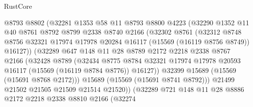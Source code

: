 \begin{lexlean}{RustCore}
\begin{coremodule}
                      @8793
                      @8802
                      (@32281
                        @1353
                        @58
                        @11
                        @8793
                        @8800
                        @4223
                        (@32290
                          @1352
                          @11
                          @40
                          @8761
                          @8792
                          @8799
                          @2338
                          @8740
                          @2166
                          (@32302
                            @8761
                            (@32312
                              @8748
                              @8756
                              @32321
                              @17974
                              @17978
                              @20284
                              @16117
                              (@15569 (@16119 @8756 @8749))
                              @16127))
                          (@32289
                            @647
                            @148
                            @11
                            @28
                            @8789
                            @2172
                            @2218
                            @2338
                            @8767
                            @2166
                            (@32428
                              @8789
                              (@32434
                                @8775
                                @8784
                                @32321
                                @17974
                                @17978
                                @20593
                                @16117
                                (@15569 (@16119 @8784 @8776))
                                @16127))
                            @32399
                            @15689
                            (@15569 (@15691 @8768 @2172)))
                          @15689
                          (@15569 (@15691 @8741 @8792)))
                        @21499
                        @21502
                        @21505
                        @21509
                        @21514
                        @21520))
                    (@32289
                      @721
                      @148
                      @11
                      @28
                      @8886
                      @2172
                      @2218
                      @2338
                      @8810
                      @2166
                      (@32274

\end{coremodule}
\end{lexlean}
